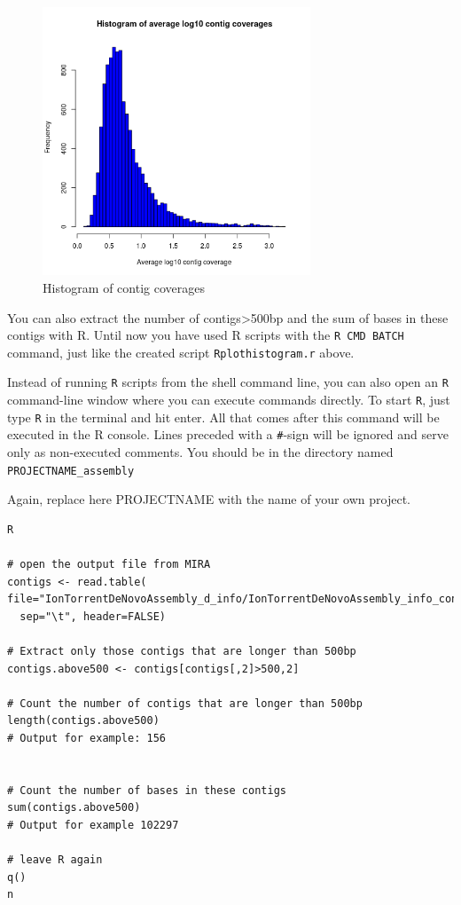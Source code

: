 \documentclass[11pt]{article}
\begin{document}
\begin{figure}[htb]
\centering
\includegraphics[width=8cm]{ContigCoverages.png}
\caption{\label{fig:histcontcov}Histogram of contig coverages}
\end{figure}





You can also extract the number of contigs>500bp and the sum of bases
in these contigs with R. Until now you have used R scripts with the \texttt{R
CMD BATCH} command, just like the created script \texttt{Rplothistogram.r}
above.

Instead of running \texttt{R} scripts from the shell command line, you can
also open an \texttt{R} command-line window where you can execute commands
directly. To start \texttt{R}, just type \texttt{R} in the terminal and hit
enter. All that comes after this command will be executed in the R
console. Lines preceded with a \texttt{\#}-sign will be ignored and serve only
as non-executed comments. You should be in the directory named
\texttt{PROJECTNAME\_assembly}

Again, replace here PROJECTNAME with the name of your own project.

\begin{verbatim}
R

# open the output file from MIRA
contigs <- read.table( 
file="IonTorrentDeNovoAssembly_d_info/IonTorrentDeNovoAssembly_info_contigstats.txt", 
  sep="\t", header=FALSE)

# Extract only those contigs that are longer than 500bp
contigs.above500 <- contigs[contigs[,2]>500,2]

# Count the number of contigs that are longer than 500bp
length(contigs.above500)
# Output for example: 156


# Count the number of bases in these contigs
sum(contigs.above500)
# Output for example 102297

# leave R again
q()
n
\end{verbatim}
\end{document}
